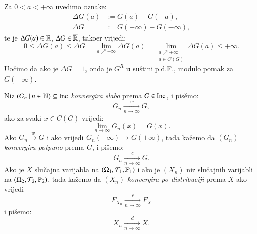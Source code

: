 Za $0 < a < +\infty$ uvedimo oznake:
\begin{equation*}
        \begin{aligned}
            \Delta G(a) &:= G(a) - G(-a),\\
            \Delta G &:= G(+\infty) - G(-\infty),
        \end{aligned}
\end{equation*}
te je $\Delta G(a) \in \mathbb{R}$, $\Delta G \in \overline{\mathbb{R}}$, tako\dj er vrijedi:
\begin{equation}    \label{jed:16.4}
    0 \leq \Delta G(a) \leq \Delta G = \lim\limits_{a \nearrow +\infty} \Delta G (a) = \lim\limits_{
        \begin{smallmatrix}
            a \nearrow +\infty\\
            a \in C(G)
        \end{smallmatrix}
    } \Delta G (a) \leq +\infty.
\end{equation}
Uo\v cimo da ako je $\Delta G = 1$, onda je $G^R$ u su\v stini p.d.F., modulo pomak za $G(-\infty)$.

\begin{defn}    \label{defn:16.5}
    Niz $({G_n} \: | \: {n \in \mathbb{N}}) \subseteq \mathrm{Inc}$ \emph{konvergira slabo} prema $G \in \mathrm{Inc}$, i pis\v emo:
    \begin{equation*}
        G_n \xrightarrow[n \to \infty]{w} G,
    \end{equation*}
    ako za svaki $x \in C(G)$ vrijedi:
    \begin{equation*}
        \lim\limits_{n \to \infty} G_n(x) = G(x).
    \end{equation*}
    Ako $G_n \xrightarrow{w} G$ i ako vrijedi $G_n (\pm \infty) \xrightarrow{} G(\pm \infty)$, tada ka\v zemo da $(G_n)$ \emph{konvergira potpuno} prema $G$, i pi\v semo:
    \begin{equation*}
        G_n \xrightarrow[n \to \infty]{c} G.
    \end{equation*}
    Ako je $X$ slu\v cajna varijabla na $(\Omega_1, \mathcal{F}_1, \mathbb{P}_1)$ i ako je $(X_n)$ niz slu\v cajnih varijabli na $(\Omega_2, \mathcal{F}_2, \mathbb{P}_2)$, tada ka\v zemo da $(X_n)$ \emph{konvergira po distribuciji} prema $X$ ako vrijedi
    \begin{equation*}
        F_{X_n} \xrightarrow[n \to \infty]{c} F_X
    \end{equation*}
    i pi\v semo:
    \begin{equation*}
        X_n \xrightarrow[n \to \infty]{d} X.
    \end{equation*}
\end{defn}

